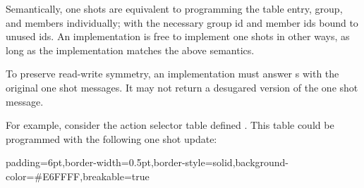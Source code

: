 \documentclass[11pt]{article}
\begin{document}
{%
\noindent{}Semantically, one shots are equivalent to programming the table entry, group,
and members individually; with the necessary group id and member ids bound to
unused ids. An implementation is free to implement one shots in other ways, as
long as the implementation matches the above semantics.%

To preserve read-write symmetry, an implementation must answer s
with the original one shot messages. It may not return a desugared version of
the one shot message.%

For example, consider the action selector table defined
. This table could be programmed
with the following one shot update:%

\begin{mdbmargintb}{6pt}{6pt}%
\begin{mdblock}{padding=6pt,border-width=0.5pt,border-style=solid,background-color=\#E6FFFF,breakable=true}%
\begin{mdpre}%
\end{mdpre}%
\end{mdblock}%
\end{mdbmargintb}%

}
\end{document}
